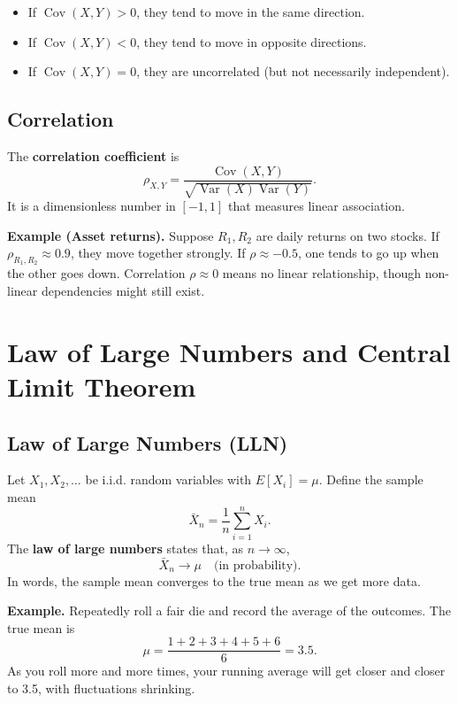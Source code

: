 \documentclass[11pt,a4paper]{article}
\begin{document}
\begin{itemize}
    \item If \(\operatorname{Cov}(X,Y) > 0\), they tend to move in the same direction.
    \item If \(\operatorname{Cov}(X,Y) < 0\), they tend to move in opposite directions.
    \item If \(\operatorname{Cov}(X,Y) = 0\), they are uncorrelated (but not necessarily independent).
\end{itemize}

\subsection{Correlation}

The \textbf{correlation coefficient} is
\[
\rho_{X,Y} = \frac{\operatorname{Cov}(X,Y)}{\sqrt{\operatorname{Var}(X)\operatorname{Var}(Y)}}.
\]
It is a dimensionless number in \([-1,1]\) that measures linear association.

\textbf{Example (Asset returns).}  
Suppose \(R_1, R_2\) are daily returns on two stocks.  
If \(\rho_{R_1,R_2} \approx 0.9\), they move together strongly.  
If \(\rho \approx -0.5\), one tends to go up when the other goes down.  
Correlation \(\rho \approx 0\) means no linear relationship, though non-linear dependencies might still exist.

\newpage

\section{Law of Large Numbers and Central Limit Theorem}

\subsection{Law of Large Numbers (LLN)}

Let \(X_1, X_2, \dots\) be i.i.d. random variables with \(E[X_i] = \mu\).  
Define the sample mean
\[
\bar{X}_n = \frac{1}{n}\sum_{i=1}^{n} X_i.
\]
The \textbf{law of large numbers} states that, as \(n \to \infty\),
\[
\bar{X}_n \to \mu \quad \text{(in probability)}.
\]
In words, the sample mean converges to the true mean as we get more data.

\textbf{Example.}  
Repeatedly roll a fair die and record the average of the outcomes.  
The true mean is
\[
\mu = \frac{1+2+3+4+5+6}{6} = 3.5.
\]
As you roll more and more times, your running average will get closer and closer to 3.5, with fluctuations shrinking.
\end{document}
